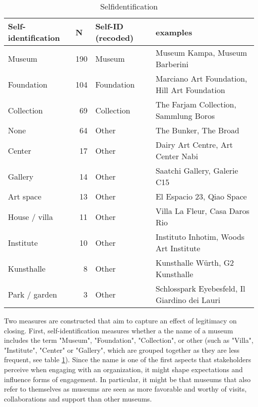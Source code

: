 \documentclass[12pt]{article}
\begin{document}
\begin{table}[ht]
\centering
\begin{tabular}{lrll}
  \hline 
 \multicolumn{1}{l}{Self-identification} & \multicolumn{1}{l}{N} & \multicolumn{1}{l}{Self-ID (recoded)} & \multicolumn{1}{l}{examples}\\ 
 \hline
 Museum & 190 & Museum & Museum Kampa, Museum Barberini \\ 
  Foundation & 104 & Foundation & Marciano Art Foundation, Hill Art Foundation \\ 
  Collection &  69 & Collection & The Farjam Collection, Sammlung Boros \\ 
  None &  64 & Other & The Bunker, The Broad \\ 
  Center &  17 & Other & Dairy Art Centre, Art Center Nabi \\ 
  Gallery &  14 & Other & Saatchi Gallery, Galerie C15 \\ 
  Art space &  13 & Other & El Espacio 23, Qiao Space \\ 
  House / villa &  11 & Other & Villa La Fleur, Casa Daros Rio \\ 
  Institute &  10 & Other & Instituto Inhotim, Woods Art Institute \\ 
  Kunsthalle &   8 & Other & Kunsthalle Würth, G2 Kunsthalle \\ 
  Park / garden &   3 & Other & Schlosspark Eyebesfeld, Il Giardino dei Lauri \\ 
   \hline
\end{tabular}
\caption{Selfidentification} 
\label{tbl:t_selfid}
\end{table}

Two measures are constructed that aim to capture an effect of legitimacy on closing.
First, self-identification measures whether a the name of a museum includes the term "Museum", "Foundation", "Collection", or other (such as "Villa", "Institute", "Center" or "Gallery", which are grouped together as they are less frequent, see table \ref{tbl:t_selfid}).
Since the name is one of the first aspects that stakeholders perceive when engaging with an organization, it might shape expectations and influence forms of engagement.
In particular, it might be that museums that also refer to themselves as museums are seen as more favorable and worthy of visits, collaborations and support than other museums.
\end{document}
